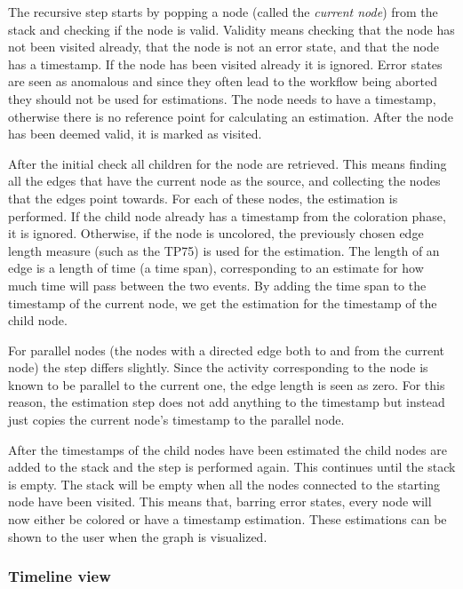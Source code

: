 The recursive step starts by popping a node (called the \emph{current node}) from the stack and checking if the node is valid.
Validity means checking that the node has not been visited already, that the node is not an error state, and that the node has a timestamp.
If the node has been visited already it is ignored.
Error states are seen as anomalous and since they often lead to the workflow being aborted they should not be used for estimations.
The node needs to have a timestamp, otherwise there is no reference point for calculating an estimation.
After the node has been deemed valid, it is marked as visited.

After the initial check all children for the node are retrieved.
This means finding all the edges that have the current node as the source, and collecting the nodes that the edges point towards.
For each of these nodes, the estimation is performed.
If the child node already has a timestamp from the coloration phase, it is ignored.
Otherwise, if the node is uncolored, the previously chosen edge length measure (such as the TP75) is used for the estimation. 
The length of an edge is a length of time (a time span), corresponding to an estimate for how much time will pass between the two events.
By adding the time span to the timestamp of the current node, we get the estimation for the timestamp of the child node.

For parallel nodes (the nodes with a directed edge both to and from the current node) the step differs slightly. 
Since the activity corresponding to the node is known to be parallel to the current one, the edge length is seen as zero.
For this reason, the estimation step does not add anything to the timestamp but instead just copies the current node's timestamp to the parallel node.

After the timestamps of the child nodes have been estimated the child nodes are added to the stack and the step is performed again.
This continues until the stack is empty.
The stack will be empty when all the nodes connected to the starting node have been visited.
This means that, barring error states, every node will now either be colored or have a timestamp estimation.
These estimations can be shown to the user when the graph is visualized.

\subsubsection{Timeline view}

